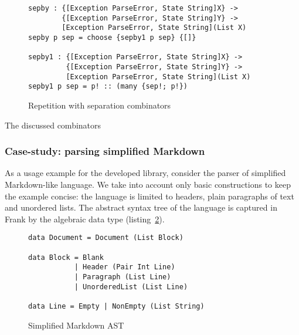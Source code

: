     \begin{figure}[h]
    \begin{lstlisting}
sepby : {[Exception ParseError, State String]X} ->
        {[Exception ParseError, State String]Y} ->
        [Exception ParseError, State String](List X)
sepby p sep = choose {sepby1 p sep} {[]}

sepby1 : {[Exception ParseError, State String]X} ->
         {[Exception ParseError, State String]Y} ->
         [Exception ParseError, State String](List X)
sepby1 p sep = p! :: (many {sep!; p!})
    \end{lstlisting}
    \caption{Repetition with separation combinators}
    \label{listing:parserSepbyCombo}
    \end{figure}

    The discussed combinators

    \subsubsection{Case-study: parsing simplified Markdown}

    As a usage example for the developed library, consider the
    parser of simplified Markdown-like language. We take into account only basic
    constructions to keep the example concise: the language is limited to headers,
    plain paragraphs of text and unordered lists. The abstract syntax tree of
    the language is captured in Frank by the algebraic data type
    (listing~\ref{listing:parserMdAstCombo}).

      \begin{figure}[h]
      \begin{lstlisting}
data Document = Document (List Block)

data Block = Blank
           | Header (Pair Int Line)
           | Paragraph (List Line)
           | UnorderedList (List Line)

data Line = Empty | NonEmpty (List String)
      \end{lstlisting}
      \caption{Simplified Markdown AST}
      \label{listing:parserMdAstCombo}
      \end{figure}

